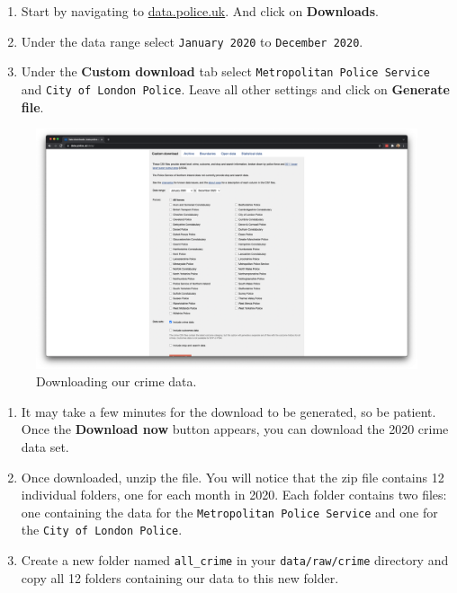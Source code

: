 \documentclass[
]{book}
\providecommand{\tightlist}{%
  \setlength{\itemsep}{0pt}\setlength{\parskip}{0pt}}
\begin{document}
\begin{enumerate}
\def\labelenumi{\arabic{enumi}.}
\tightlist
\item
  Start by navigating to \href{https://data.police.uk/}{data.police.uk}. And click on \textbf{Downloads}.
\item
  Under the data range select \texttt{January\ 2020} to \texttt{December\ 2020}.
\item
  Under the \textbf{Custom download} tab select \texttt{Metropolitan\ Police\ Service} and \texttt{City\ of\ London\ Police}. Leave all other settings and click on \textbf{Generate file}.
\end{enumerate}

\begin{figure}

{\centering \includegraphics[width=0.9\linewidth]{images/w04/download-crime} 

}

\caption{Downloading our crime data.}\label{fig:04-download-crimes}
\end{figure}

\begin{enumerate}
\def\labelenumi{\arabic{enumi}.}
\setcounter{enumi}{3}
\tightlist
\item
  It may take a few minutes for the download to be generated, so be patient. Once the \textbf{Download now} button appears, you can download the 2020 crime data set.
\item
  Once downloaded, unzip the file. You will notice that the zip file contains 12 individual folders, one for each month in 2020. Each folder contains two files: one containing the data for the \texttt{Metropolitan\ Police\ Service} and one for the \texttt{City\ of\ London\ Police}.
\item
  Create a new folder named \texttt{all\_crime} in your \texttt{data/raw/crime} directory and copy all 12 folders containing our data to this new folder.
\end{enumerate}
\end{document}
